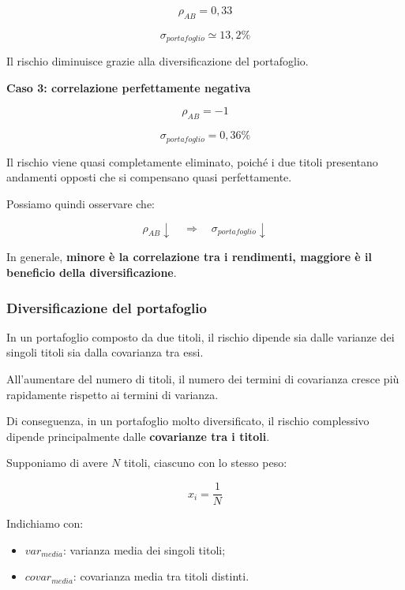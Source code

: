 \[
\rho_{AB}=0{,}33
\]

\[
\boxed{\sigma_{portafoglio}\simeq13{,}2\%}
\]

\noindent Il rischio diminuisce grazie
alla diversificazione del portafoglio.

\medskip

\noindent \textbf{Caso 3: correlazione perfettamente negativa}

\[
\rho_{AB}=-1
\]

\[
\boxed{\sigma_{portafoglio}=0{,}36\%}
\]

\noindent Il rischio viene quasi completamente eliminato,
poiché i due titoli presentano andamenti opposti
che si compensano quasi perfettamente.

\medskip

\noindent Possiamo quindi osservare che:

\[
\boxed{
\rho_{AB}\downarrow
\quad\Longrightarrow\quad
\sigma_{portafoglio}\downarrow
}
\]

\noindent In generale, \textbf{minore è la correlazione
tra i rendimenti, maggiore è il beneficio
della diversificazione}.

\subsubsection*{Diversificazione del portafoglio}

\noindent In un portafoglio composto da due titoli,
il rischio dipende sia dalle varianze dei singoli titoli
sia dalla covarianza tra essi.

\medskip

\noindent All'aumentare del numero di titoli,
il numero dei termini di covarianza cresce
più rapidamente rispetto ai termini di varianza.

\medskip

\noindent Di conseguenza, in un portafoglio molto
diversificato, il rischio complessivo dipende
principalmente dalle \textbf{covarianze tra i titoli}.

\medskip

\noindent Supponiamo di avere $N$ titoli,
ciascuno con lo stesso peso:

\[
x_i=\frac{1}{N}
\]

\noindent Indichiamo con:

\begin{itemize}
    \item $var_{media}$: varianza media dei singoli titoli;
    \item $covar_{media}$: covarianza media tra titoli distinti.
\end{itemize}

